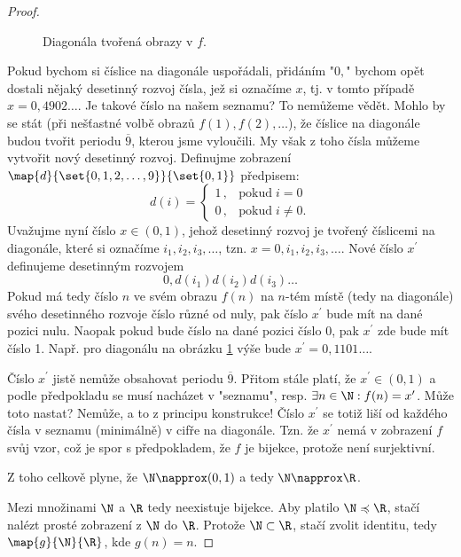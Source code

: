 \begin{proof}
\begin{figure}[H]
        \caption{Diagonála tvořená obrazy v $f$.}
        \label{fig:diagonala_realna_a_prirozena_cisla}
    \end{figure}
    Pokud bychom si číslice na diagonále uspořádali, přidáním "$0,$" bychom opět dostali nějaký desetinný rozvoj čísla, jež si označíme $x$, tj. v tomto případě $x=0,4902\dots$. Je takové číslo na našem seznamu? To nemůžeme vědět. Mohlo by se stát (při nešťastné volbě obrazů $f(1),f(2),\dots$), že číslice na diagonále budou tvořit periodu $\overline{9}$, kterou jsme vyloučili. My však z toho čísla můžeme vytvořit nový desetinný rozvoj. Definujme zobrazení $\map{d}{\set{0,1,2,\dots,9}}{\set{0,1}}$ předpisem:
    \begin{equation*}
        d(i)=\left\{
        \begin{array}{ll}
            1\,, & \text{pokud}\;i=0\\
            0\,, & \text{pokud}\;i\neq 0.
        \end{array}
        \right.
    \end{equation*}
    Uvažujme nyní číslo $x\in(0,1)$, jehož desetinný rozvoj je tvořený číslicemi na diagonále, které si označíme $i_1,i_2,i_3,\dots$, tzn. $x=0,i_1,i_2,i_3,\dots$. Nové číslo $x^\prime$ definujeme desetinným rozvojem
    \begin{equation*}
        0,d(i_1)d(i_2)d(i_3)\dots
    \end{equation*}
    Pokud má tedy číslo $n$ ve svém obrazu $f(n)$ na $n$-tém místě (tedy na diagonále) svého desetinného rozvoje číslo různé od nuly, pak číslo $x^\prime$ bude mít na dané pozici nulu. Naopak pokud bude číslo na dané pozici číslo 0, pak $x^\prime$ zde bude mít číslo 1. Např. pro diagonálu na obrázku \ref{fig:diagonala_realna_a_prirozena_cisla} výše bude $x^\prime=0,1101\dots$.\par
    Číslo $x^\prime$ jistě nemůže obsahovat periodu $\overline{9}$. Přitom stále platí, že $x^\prime\in(0,1)$ a podle předpokladu se musí nacházet v "seznamu", resp. $\exists n\in\N: f(n)=x^\prime$. Může toto nastat? Nemůže, a to z principu konstrukce! Číslo $x^\prime$ se totiž liší od každého čísla v seznamu (minimálně) v cifře na diagonále. Tzn. že $x^\prime$ nemá v zobrazení $f$ svůj vzor, což je spor s předpokladem, že $f$ je bijekce, protože není surjektivní.\par
    Z toho celkově plyne, že $\N\napprox(0,1)$ a tedy $\N\napprox\R$.
    \medskip

    Mezi množinami $\N$ a $\R$ tedy neexistuje bijekce. Aby platilo $\N\preccurlyeq\R$, stačí nalézt prosté zobrazení z $\N$ do $\R$. Protože $\N\subset\R$, stačí zvolit identitu, tedy $\map{g}{\N}{\R}$, kde $g(n)=n$.
\end{proof}
